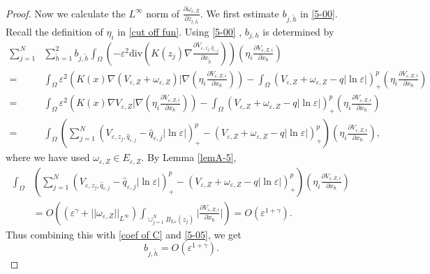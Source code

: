 \documentclass[12pt,reqno]{amsart}
\numberwithin{equation}{section}
\theoremstyle{definition}
\theoremstyle{remark}
\begin{document}
\begin{proof}
Now we calculate the $ L^\infty $ norm of $ \frac{\partial \omega_{\varepsilon,Z}}{\partial z_{l,\bar{h}}}. $ We first estimate $ b_{j,\tilde{h}} $ in \eqref{5-00}. Recall the definition of $ \eta_i $ in \eqref{cut off fun}. Using \eqref{5-00}%
, $ b_{j,h} $ is determined by
\begin{equation}\label{5-05}
\begin{split}
\sum_{j=1}^N&\sum_{\tilde{h}=1}^2b_{j,\tilde{h}}\int_\Omega\left( -\varepsilon^2\text{div}\left (K(z_j)\nabla   \frac{\partial V_{\varepsilon, z_j, \hat{q}_{\varepsilon,j}}}{\partial x_{\tilde{h}}}\right )\right)\left( \eta_i\frac{\partial V_{\varepsilon, Z,i}}{\partial x_\hbar}\right)\\
=&\int_\Omega\varepsilon^2\left (K(x)\nabla(V_{\varepsilon,Z}+\omega_{\varepsilon,Z})|\nabla\left( \eta_i\frac{\partial V_{\varepsilon, Z,i}}{\partial x_\hbar}\right)\right )-\int_\Omega\left (V_{\varepsilon,Z}+\omega_{\varepsilon,Z}-q|\ln\varepsilon|\right )^p_+\left( \eta_i\frac{\partial V_{\varepsilon, Z,i}}{\partial x_\hbar}\right)\\
=&\int_\Omega\varepsilon^2\left (K(x)\nabla V_{\varepsilon,Z}|\nabla\left( \eta_i\frac{\partial V_{\varepsilon, Z,i}}{\partial x_\hbar}\right)\right )-\int_\Omega\left (V_{\varepsilon,Z}+\omega_{\varepsilon,Z}-q|\ln\varepsilon|\right )^p_+\left( \eta_i\frac{\partial V_{\varepsilon, Z,i}}{\partial x_\hbar}\right)\\
=&\int_\Omega\left( \sum_{j=1}^N\left (V_{\varepsilon, z_j, \hat{q}_{\varepsilon,j}}-\hat{q}_{\varepsilon,j}|\ln\varepsilon|\right )^{p}_+-\left (V_{\varepsilon,Z}+\omega_{\varepsilon,Z}-q|\ln\varepsilon|\right )^{p}_+\right) \left( \eta_i\frac{\partial V_{\varepsilon, Z,i}}{\partial x_\hbar}\right),
\end{split}
\end{equation}
where we have used $ \omega_{\varepsilon,Z}\in E_{\varepsilon,Z} $. By Lemma \ref{lemA-5},
\begin{equation*}
\begin{split}
\int_\Omega&\left( \sum_{j=1}^N\left (V_{\varepsilon, z_j, \hat{q}_{\varepsilon,j}}-\hat{q}_{\varepsilon,j}|\ln\varepsilon|\right )^{p}_+-\left (V_{\varepsilon,Z}+\omega_{\varepsilon,Z}-q|\ln\varepsilon|\right )^{p}_+\right) \left( \eta_i\frac{\partial V_{\varepsilon, Z,i}}{\partial x_\hbar}\right)\\
&=O\left (\left (\varepsilon^\gamma+||\omega_{\varepsilon,Z}||_{L^\infty}\right )\int_{\cup_{j=1}^NB_{L\varepsilon}(z_j)}\bigg|\frac{\partial V_{\varepsilon, Z,i}}{\partial x_\hbar} \bigg|\right )=O\left (\varepsilon^{1+\gamma}\right ).
\end{split}
\end{equation*}
Thus combining this with \eqref{coef of C} and \eqref{5-05}, we get
\begin{equation}\label{5-06}
b_{j,\tilde{h}}=O\left ( \varepsilon^{1+\gamma} \right ).
\end{equation}


\end{proof}
\end{document}
